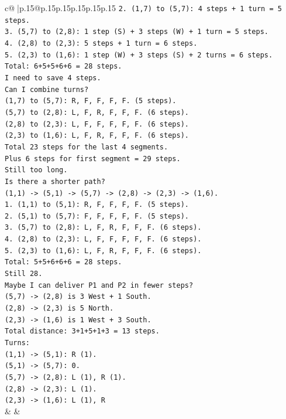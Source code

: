 \documentclass{article}
\begin{document}
{\begin{supertabular}{c@{$\;$}|p{.15\linewidth}@{}p{.15\linewidth}p{.15\linewidth}p{.15\linewidth}p{.15\linewidth}p{.15\linewidth}}
{{{\texttt{2. (1,7) to (5,7): 4 steps + 1 turn = 5 steps.} \\
\texttt{3. (5,7) to (2,8): 1 step (S) + 3 steps (W) + 1 turn = 5 steps.} \\
\texttt{4. (2,8) to (2,3): 5 steps + 1 turn = 6 steps.} \\
\texttt{5. (2,3) to (1,6): 1 step (W) + 3 steps (S) + 2 turns = 6 steps.} \\
\texttt{Total: 6+5+5+6+6 = 28 steps.} \\
\texttt{I need to save 4 steps.} \\
\texttt{Can I combine turns?} \\
\texttt{(1,7) to (5,7): R, F, F, F, F. (5 steps).} \\
\texttt{(5,7) to (2,8): L, F, R, F, F, F. (6 steps).} \\
\texttt{(2,8) to (2,3): L, F, F, F, F, F. (6 steps).} \\
\texttt{(2,3) to (1,6): L, F, R, F, F, F. (6 steps).} \\
\texttt{Total 23 steps for the last 4 segments.} \\
\texttt{Plus 6 steps for first segment = 29 steps.} \\
\texttt{Still too long.} \\
\texttt{Is there a shorter path?} \\
\texttt{(1,1) {-}> (5,1) {-}> (5,7) {-}> (2,8) {-}> (2,3) {-}> (1,6).} \\
\texttt{1. (1,1) to (5,1): R, F, F, F, F. (5 steps).} \\
\texttt{2. (5,1) to (5,7): F, F, F, F, F. (5 steps).} \\
\texttt{3. (5,7) to (2,8): L, F, R, F, F, F. (6 steps).} \\
\texttt{4. (2,8) to (2,3): L, F, F, F, F, F. (6 steps).} \\
\texttt{5. (2,3) to (1,6): L, F, R, F, F, F. (6 steps).} \\
\texttt{Total: 5+5+6+6+6 = 28 steps.} \\
\texttt{Still 28.} \\
\texttt{Maybe I can deliver P1 and P2 in fewer steps?} \\
\texttt{(5,7) {-}> (2,8) is 3 West + 1 South.} \\
\texttt{(2,8) {-}> (2,3) is 5 North.} \\
\texttt{(2,3) {-}> (1,6) is 1 West + 3 South.} \\
\texttt{Total distance: 3+1+5+1+3 = 13 steps.} \\
\texttt{Turns:} \\
\texttt{(1,1) {-}> (5,1): R (1).} \\
\texttt{(5,1) {-}> (5,7): 0.} \\
\texttt{(5,7) {-}> (2,8): L (1), R (1).} \\
\texttt{(2,8) {-}> (2,3): L (1).} \\
\texttt{(2,3) {-}> (1,6): L (1), R} \\
            }
        }
    }
    & & \\ \\


\end{supertabular}}
\end{document}

